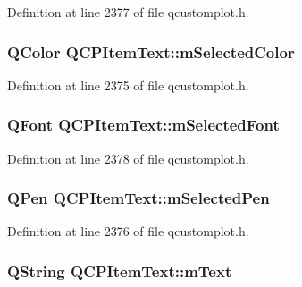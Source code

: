 Definition at line 2377 of file qcustomplot.\-h.

\hypertarget{class_q_c_p_item_text_a7eb64e42f5f7998a97d8907ad25933c1}{
\subsubsection[{m\-Selected\-Color}]{\setlength{\rightskip}{0pt plus 5cm}Q\-Color Q\-C\-P\-Item\-Text\-::m\-Selected\-Color\hspace{0.3cm}{\ttfamily [protected]}}}\label{class_q_c_p_item_text_a7eb64e42f5f7998a97d8907ad25933c1}


Definition at line 2375 of file qcustomplot.\-h.

\hypertarget{class_q_c_p_item_text_a6702f141fae590b2f4f1ec02fe9f8bd5}{
\subsubsection[{m\-Selected\-Font}]{\setlength{\rightskip}{0pt plus 5cm}Q\-Font Q\-C\-P\-Item\-Text\-::m\-Selected\-Font\hspace{0.3cm}{\ttfamily [protected]}}}\label{class_q_c_p_item_text_a6702f141fae590b2f4f1ec02fe9f8bd5}


Definition at line 2378 of file qcustomplot.\-h.

\hypertarget{class_q_c_p_item_text_a8eaec649606d6ead2d8d4dcb5691777c}{
\subsubsection[{m\-Selected\-Pen}]{\setlength{\rightskip}{0pt plus 5cm}Q\-Pen Q\-C\-P\-Item\-Text\-::m\-Selected\-Pen\hspace{0.3cm}{\ttfamily [protected]}}}\label{class_q_c_p_item_text_a8eaec649606d6ead2d8d4dcb5691777c}


Definition at line 2376 of file qcustomplot.\-h.

\hypertarget{class_q_c_p_item_text_a2dec3e08c11f51639629374ecec3bd62}{
\subsubsection[{m\-Text}]{\setlength{\rightskip}{0pt plus 5cm}Q\-String Q\-C\-P\-Item\-Text\-::m\-Text\hspace{0.3cm}{\ttfamily [protected]}}}\label{class_q_c_p_item_text_a2dec3e08c11f51639629374ecec3bd62}


